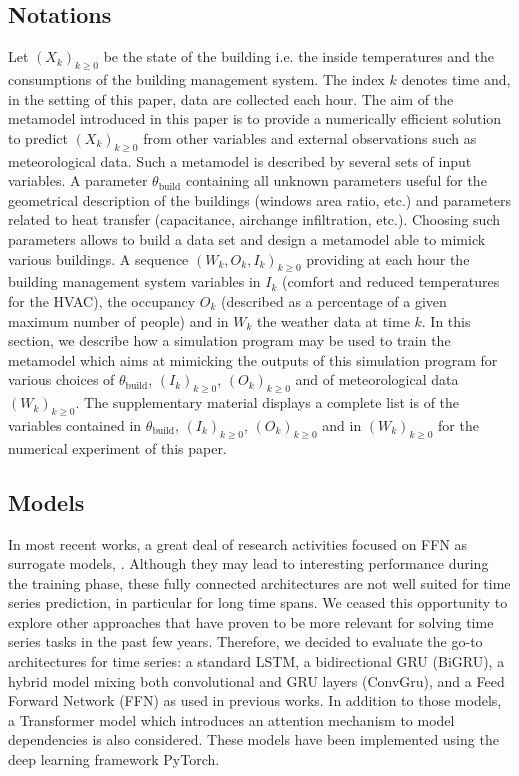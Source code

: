 \documentclass[12pt]{article}
\begin{document}
\subsection{Notations}
Let $(X_k)_{k\geqslant 0}$ be the state of the building i.e. the inside temperatures and the consumptions of the building management system. The index $k$ denotes time and, in the setting of this paper, data are collected each hour. The aim of the metamodel introduced in this paper is to provide a numerically efficient solution to predict $(X_k)_{k\geqslant 0}$ from other variables and external observations such as meteorological data. Such a metamodel is described by several sets of input variables. A parameter $\theta_{\mathrm{build}}$ containing all unknown parameters useful for the geometrical description of the buildings (windows area ratio, etc.) and parameters related to heat transfer  (capacitance, airchange infiltration, etc.). Choosing such parameters allows to build a data set and design a metamodel able to mimick various buildings.%
A sequence $(W_k,O_k,I_k)_{k\geqslant 0}$ providing at each hour the building management system variables in $I_k$ (comfort and reduced temperatures for the HVAC), the occupancy $O_k$ (described as a percentage of a given maximum number of people) and in $W_k$ the weather data at time $k$. In this section, we describe how a simulation program may be used to train the metamodel which aims at mimicking the outputs of this simulation program for  various choices of $\theta_{\mathrm{build}}$, $(I_k)_{k\geqslant 0}$, $(O_k)_{k\geqslant 0}$ and of meteorological data $(W_k)_{k\geqslant 0}$. The supplementary material  displays a complete list is of the variables contained in $\theta_{\mathrm{build}}$, $(I_k)_{k\geqslant 0}$, $(O_k)_{k\geqslant 0}$ and in $(W_k)_{k\geqslant 0}$ for the numerical experiment of this paper.

\subsection{Models}
In most recent works, a great deal of research activities focused on FFN as surrogate models, \cite{Bre2020AnEM,Magnier2010MultiobjectiveOO, Reynolds2018AZB}. Although they may lead to interesting performance during the training phase, these fully connected architectures are not well suited for time series prediction, in particular for long time spans. We ceased this opportunity to explore other approaches that have proven to be more relevant for solving time series tasks in the past few years. Therefore, we decided to evaluate the go-to architectures for time series: a standard LSTM, a bidirectional GRU (BiGRU), a hybrid model mixing both convolutional and GRU layers (ConvGru), and a Feed Forward Network (FFN) as used in previous works.  In addition to those models, a Transformer model which  introduces an attention mechanism to model dependencies is also considered. These models have been implemented using the deep learning framework PyTorch.%
\end{document}
